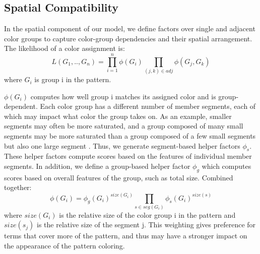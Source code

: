 \subsection{Spatial Compatibility}
\label{sec:spatialCompat}




In the spatial component of our model, we define factors over single and adjacent color groups to capture color-group dependencies and their spatial arrangement. The likelihood of a color assignment is:
\begin{equation}
L(G_1,..,G_n) = \prod_{i=1}^n \phi(G_i) \prod_{(j,k) \in adj} \phi(G_j, G_k)
\end{equation}
where $G_i$ is group i in the pattern.

$\phi(G_i)$ computes how well group i matches its assigned color and is group-dependent. Each color group has a different number of member segments, each of which may impact what color the group takes on. As an example, smaller segments may often be more saturated, and a group composed of many small segments may be more saturated than a group composed of a few small segments but also one large segment . Thus, we generate segment-based helper factors $\phi_s$. These helper factors compute scores based on the features of individual member segments. In addition, we define a group-based helper factor $\phi_g$ which computes scores based on overall features of the group, such as total size. Combined together:
\begin{equation}
\phi(G_i) = \phi_g(G_i)^{size(G_i)} \prod_{s \in seg(G_i)} \phi_{s}(G_i)^{size(s)}
\end{equation}
where $size(G_i)$ is the relative size of the color group i in the pattern and $size({s_j})$ is the relative size of the segment j. This weighting gives preference for terms that cover more of the pattern, and thus may have a stronger impact on the appearance of the pattern coloring.


